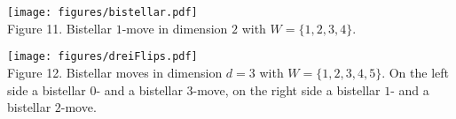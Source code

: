 \documentclass[a4paper,11pt]{report}
\begin{document}
{{ 
	\medskip
	
	 

 
	\begin{center}
	\texttt{[image: figures/bistellar.pdf]}\\\bigskip
	{\small Figure 11. Bistellar $1$-move in dimension $2$ with 
 $W = \{ 1,2,3,4 \}$.}
	\end{center}
	
	 

 
	\medskip
	
	 

 
	\begin{center}
	\texttt{[image: figures/dreiFlips.pdf]}\\\bigskip
	{\small Figure 12. Bistellar moves in dimension $d=3$ with 
 $W = \{ 1,2,3,4,5 \} $. On the left side a bistellar $0$- and a bistellar 
 $3$-move, on the right side a bistellar $1$- and a bistellar $2$-move.}
 \end{center}
	
	 

}}
\end{document}
